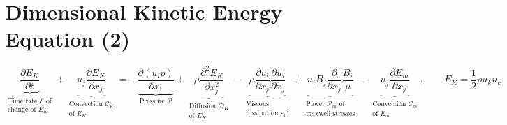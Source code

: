 \documentclass[11pt]{article}
\newcommand{\PD}{\partial}
\newcommand{\MC}{\mathcal}
\begin{document}
\section{Dimensional Kinetic Energy Equation (2)}
\begin{equation}
	\boxed{
	\underbrace{\frac{\PD E_K}{\PD t}}_{\substack{\text{Time rate $\dot{\MC E}$ of} \\ \text{change of $E_K$}}} +
	\underbrace{u_j \frac{\PD E_K}{\PD x_j}}_
	{\substack{\text{Convection } \MC C_K \\\text{of $E_K$}}}
	=
	- \underbrace{\frac{\PD (u_i p)}{\PD x_i}}_{\text{Pressure } \MC P}
	+ \underbrace{ \mu \frac{\PD^2 E_K}{\PD x_j^2} }_{\substack{\text{Diffusion } \MC D_K \\ \text{of $E_K$ }}}
	- \underbrace{\mu \frac{\PD u_i}{\PD x_j}\frac{\PD u_i}{\PD x_j} }_{\substack{\text{Viscous } \\ \text{dissipation } \varepsilon_v'}}
	+ \underbrace{u_i B_j \frac{\PD}{\PD x_j} \frac{B_i}{\mu}}_
	{\substack{\text{Power $\MC P_{m}$ of}\\\text{maxwell stresses}}}
	- \underbrace{u_j \frac{\PD E_m}{\PD x_j}}_
	{\substack{\text{Convection $\MC C_m$}\\\text{of $E_m$}}}
	, \qquad
	E_K = \frac{1}{2} \rho u_k u_k
	}
\end{equation}
\end{document}

